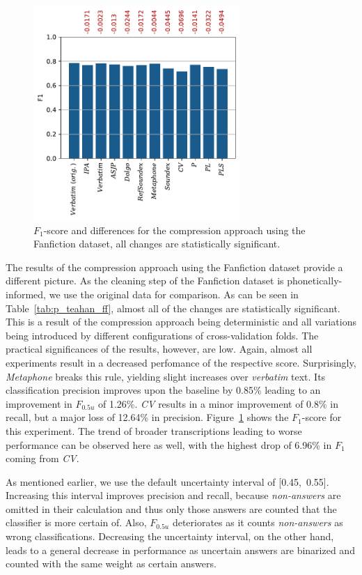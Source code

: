 \begin{figure}
  \centering
  \includegraphics[width=0.7\textwidth]{figures/results_f1_ff_teahan}
  \caption{$F_1$-score and differences for the compression approach using the Fanfiction dataset, all changes are statistically significant.}
  \label{fig:results_f1_ff_teahan}
\end{figure}
The results of the compression approach using the Fanfiction dataset provide a different picture.
As the cleaning step of the Fanfiction dataset is phonetically-informed, we use the original data for comparison.
As can be seen in Table~\ref{tab:p_teahan_ff}, almost all of the changes are statistically significant.
This is a result of the compression approach being deterministic and all variations being introduced by different configurations of cross-validation folds.
The practical significances of the results, however, are low.
Again, almost all experiments result in a decreased perfomance of the respective score.
Surprisingly, \textit{Metaphone} breaks this rule, yielding slight increases over \textit{verbatim} text.
Its classification precision improves upon the baseline by 0.85\% leading to an improvement in $F_{0.5u}$ of 1.26\%.
\textit{CV} results in a minor improvement of 0.8\% in recall, but a major loss of 12.64\% in precision.
Figure~\ref{fig:results_f1_ff_teahan} shows the $F_1$-score for this experiment.
The trend of broader transcriptions leading to worse performance can be observed here as well, with the highest drop of 6.96\% in $F_1$ coming from \textit{CV}.

As mentioned earlier, we use the default uncertainty interval of [0.45,~0.55].
Increasing this interval improves precision and recall, because \textit{non-answers} are omitted in their calculation and thus only those answers are counted that the classifier is more certain of.
Also, $F_{0.5u}$ deteriorates as it counts \textit{non-answers} as wrong classifications.
Decreasing the uncertainty interval, on the other hand, leads to a general decrease in performance as uncertain answers are binarized and counted with the same weight as certain answers.\newline

